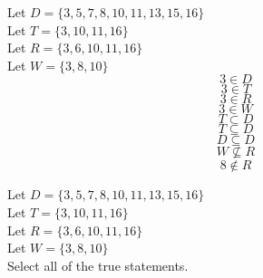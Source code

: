 \documentclass{ximera}
\begin{document}
\begin{example}


Let $D = \{ 3, 5, 7, 8, 10, 11, 13, 15, 16 \}$  \\
Let $T = \{ 3, 10, 11, 16 \}$  \\
Let $R = \{ 3, 6, 10, 11, 16 \}$   \\
Let $W = \{ 3, 8, 10 \}$   \\


\[   3 \in D  \]
\[   3 \in T  \]
\[   3 \in R  \]
\[   3 \in W  \]
\[   T \subset D \]
\[   T \subseteq D \]
\[   D \subseteq D \]
\[   W \nsubseteq R \]
\[   8 \notin R  \]


\end{example}



\begin{question}


Let $D = \{ 3, 5, 7, 8, 10, 11, 13, 15, 16 \}$  \\
Let $T = \{ 3, 10, 11, 16 \}$  \\
Let $R = \{ 3, 6, 10, 11, 16 \}$   \\
Let $W = \{ 3, 8, 10 \}$   \\


Select all of the true statements.

\begin{selectAll}
\end{selectAll}


\end{question}
\end{document}
